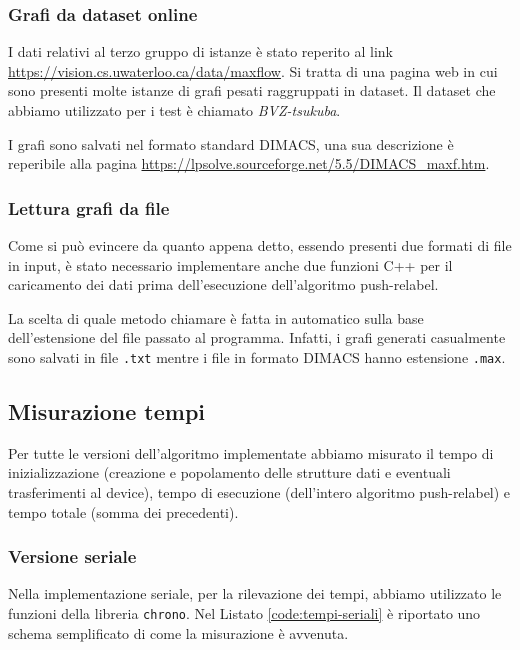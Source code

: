            \subsubsection*{Grafi da dataset online}

                I dati relativi al terzo gruppo di istanze è stato reperito al link \url{https://vision.cs.uwaterloo.ca/data/maxflow}. Si tratta di una pagina web in cui sono presenti molte istanze di grafi pesati raggruppati in dataset. Il dataset che abbiamo utilizzato per i test è chiamato \textit{BVZ-tsukuba}.

                I grafi sono salvati nel formato standard DIMACS, una sua descrizione è reperibile alla pagina \url{https://lpsolve.sourceforge.net/5.5/DIMACS_maxf.htm}.


            \subsubsection*{Lettura grafi da file}

                Come si può evincere da quanto appena detto, essendo presenti due formati di file in input, è stato necessario implementare anche due funzioni C++ per il caricamento dei dati prima dell'esecuzione dell'algoritmo push-relabel.

                La scelta di quale metodo chiamare è fatta in automatico sulla base dell'estensione del file passato al programma. Infatti, i grafi generati casualmente sono salvati in file \verb|.txt| mentre i file in formato DIMACS hanno estensione \verb|.max|.

            
        \subsection{Misurazione tempi}

            Per tutte le versioni dell'algoritmo implementate abbiamo misurato il tempo di inizializzazione (creazione e popolamento delle strutture dati e eventuali trasferimenti al device), tempo di esecuzione (dell'intero algoritmo push-relabel) e tempo totale (somma dei precedenti).

            \subsubsection*{Versione seriale}
            
                Nella implementazione seriale, per la rilevazione dei tempi, abbiamo utilizzato le funzioni della libreria \verb|chrono|. Nel Listato \ref{code:tempi-seriali} è riportato uno schema semplificato di come la misurazione è avvenuta.

